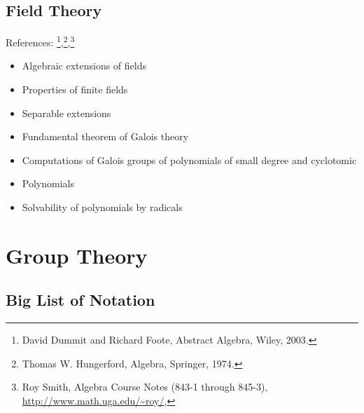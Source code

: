 \hypertarget{field-theory}{%
\subsection{Field Theory}\label{field-theory}}

References: \footnote{David Dummit and Richard Foote, Abstract Algebra,
  Wiley, 2003.},\footnote{Thomas W. Hungerford, Algebra, Springer, 1974.},\footnote{Roy
  Smith, Algebra Course Notes (843-1 through 845-3),
  \url{http://www.math.uga.edu/~roy/},}

\begin{itemize}
\item
  Algebraic extensions of fields
\item
  Properties of finite fields
\item
  Separable extensions
\item
  Fundamental theorem of Galois theory
\item
  Computations of Galois groups of polynomials of small degree and
  cyclotomic
\item
  Polynomials
\item
  Solvability of polynomials by radicals
\end{itemize}

\newpage

\hypertarget{group-theory-1}{%
\section{Group Theory}\label{group-theory-1}}

\hypertarget{big-list-of-notation}{%
\subsection{Big List of Notation}\label{big-list-of-notation}}


